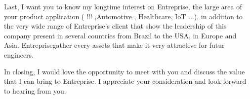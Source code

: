 \documentclass[11pt,a4paper]{moderncv}
\newcommand{\entreprise}{Entreprise}
\begin{document}
\hspace{0.8cm} Last, I want you to know my longtime interest on \entreprise, the large area of your product application ( !!! ,Automotive , Healthcare, IoT ...), in addition to the very wide range of \entreprise's client that show the leadership of this company present in several countries from Brazil to the USA, in Europe and Asia. \entreprise gather every assets that make it very attractive for futur engineers.   


\hspace{0.8cm}In closing, I would love the opportunity to meet with you and discuss the value that I can bring to \entreprise. I appreciate your consideration and look forward to hearing from you.



\makeletterclosing %
\end{document}
